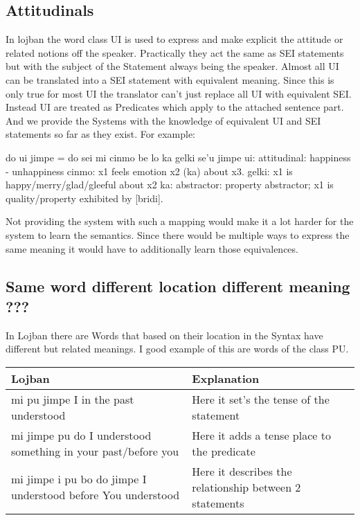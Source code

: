 \subsection{Attitudinals}

In lojban the word class UI is used to express and make explicit the attitude or related notions off the speaker. Practically they act the same as SEI statements but with the subject of the Statement always being the speaker. Almost all UI can be translated into a SEI statement with equivalent meaning. Since this is only true for most UI the translator can’t just replace all UI with equivalent SEI. Instead UI are treated as Predicates which apply to the attached sentence part. And we provide the Systems with the knowledge of equivalent UI and SEI statements so far as they exist.
For example:
\begin{center}
do ui jimpe = do sei mi cinmo be lo ka gelki se’u jimpe
ui: attitudinal: happiness - unhappiness
cinmo: x1 feels emotion x2 (ka) about x3.
gelki: x1 is happy/merry/glad/gleeful about x2
ka: abstractor: property abstractor; x1 is quality/property exhibited by [bridi].
\end{center}

Not providing the system with such a mapping would make it a lot harder for the system to learn the semantics. Since there would be multiple ways to express the same meaning it would have to additionally learn those equivalences.

\subsection{Same word different location different meaning ???}

In Lojban there are Words that based on their location in the Syntax have different but related meanings. I good example of this are words of the class PU.

\begin{center}
    \begin{tabular}{| p{7cm} | p{7cm} |}
        \hline
        Lojban & Explanation \\
        \hline
        mi pu jimpe \newline I in the past understood & Here it set’s the tense of the statement \\
        \hline
        mi jimpe pu do \newline I understood something in your past/before you &  Here it adds a tense place to the predicate \\
        \hline
        mi jimpe i pu bo do jimpe \newline I understood before You understood & Here it describes the relationship between 2 statements \\
        \hline
    \end{tabular}
\end{center}


